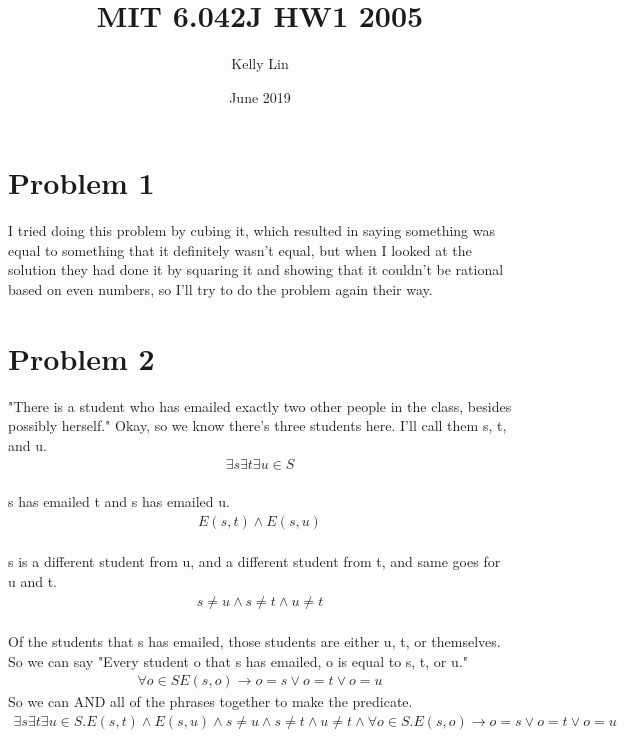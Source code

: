 \documentclass{article}
\title{MIT 6.042J HW1 2005}
\author{Kelly Lin }
\date{June 2019}
\begin{document}
\maketitle

\section{Problem 1}

I tried doing this problem by cubing it, which resulted in saying something was equal to something that it definitely wasn't equal, but when I looked at the solution they had done it by squaring it and showing that it couldn't be rational based on even numbers, so I'll try to do the problem again their way. 

\section{Problem 2}
"There is a student who has emailed exactly two other people in the class, besides possibly herself."
Okay, so we know there's three students here. I'll call them s, t, and u. 
\\
\begin {align*}
\exists s \exists t \exists u \in S 
\end {align*}
\\
s has emailed t and s has emailed u.
\\
\begin {align*}
E(s,t) \wedge E(s,u)
\end {align*}
\\
s is a different student from u, and a different student from t, and same goes for u and t. 
\\
\begin {align*}
s \neq u \wedge s \neq t \wedge u \neq t
\end {align*}
\\
Of the students that s has emailed, those students are either u, t, or themselves. So we can say "Every student o that s has emailed, o is equal to s, t, or u."
\begin {align*}
\forall o \in S E(s, o) \rightarrow o = s \vee o = t \vee o = u
\end {align*}
So we can AND all of the phrases together to make the predicate. 
\begin {align*}
\exists s \exists t \exists u \in S. E(s,t) \wedge E(s,u) \wedge s \neq u \wedge s \neq t \wedge u \neq t \wedge \forall o \in S. E(s, o) \rightarrow o = s \vee o = t \vee o = u
\end {align*}
\end{document}
